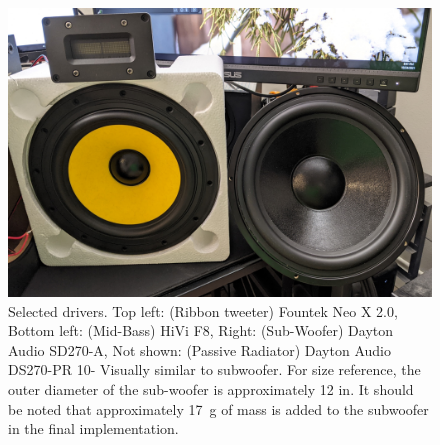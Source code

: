 \begin{figure}[h!]
\centering
\includegraphics[width = 5.3 in]{Images/sp_drivers.jpeg}
\caption{Selected drivers. Top left: (Ribbon tweeter) Fountek Neo X 2.0, Bottom left: (Mid-Bass) HiVi F8, Right: (Sub-Woofer) Dayton Audio SD270-A, Not shown: (Passive Radiator) Dayton Audio DS270-PR 10- Visually similar to subwoofer. For size reference, the outer diameter of the sub-woofer is approximately 12 in. It should be noted that approximately \SI{17}{\gram} of mass is added to the subwoofer in the final implementation.}
\label{fig:sp_drivers}
\end{figure}
%
